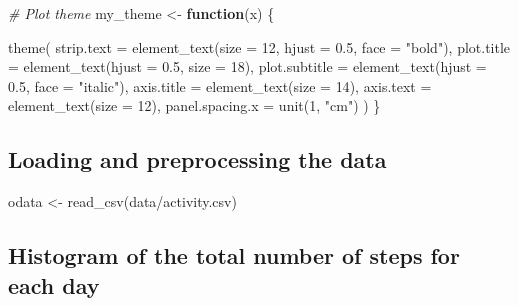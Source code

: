 \documentclass[
  paper=a4,
  ,captions=tableheading
]{scrartcl}
\newenvironment{Shaded}{\begin{snugshade}}{\end{snugshade}}
\newcommand{\AttributeTok}[1]{\textcolor[rgb]{0.77,0.63,0.00}{#1}}
\newcommand{\CommentTok}[1]{\textcolor[rgb]{0.56,0.35,0.01}{\textit{#1}}}
\newcommand{\ControlFlowTok}[1]{\textcolor[rgb]{0.13,0.29,0.53}{\textbf{#1}}}
\newcommand{\DecValTok}[1]{\textcolor[rgb]{0.00,0.00,0.81}{#1}}
\newcommand{\FloatTok}[1]{\textcolor[rgb]{0.00,0.00,0.81}{#1}}
\newcommand{\FunctionTok}[1]{\textcolor[rgb]{0.00,0.00,0.00}{#1}}
\newcommand{\NormalTok}[1]{#1}
\newcommand{\OtherTok}[1]{\textcolor[rgb]{0.56,0.35,0.01}{#1}}
\newcommand{\StringTok}[1]{\textcolor[rgb]{0.31,0.60,0.02}{#1}}
\begin{document}
\begin{Shaded}
\begin{Highlighting}[]
\CommentTok{\# Plot theme}
\NormalTok{my\_theme }\OtherTok{\textless{}{-}} \ControlFlowTok{function}\NormalTok{(x) \{}
  
    \FunctionTok{theme}\NormalTok{(}
    \AttributeTok{strip.text =} \FunctionTok{element\_text}\NormalTok{(}\AttributeTok{size =} \DecValTok{12}\NormalTok{, }\AttributeTok{hjust =} \FloatTok{0.5}\NormalTok{, }\AttributeTok{face =} \StringTok{"bold"}\NormalTok{),}
    \AttributeTok{plot.title =} \FunctionTok{element\_text}\NormalTok{(}\AttributeTok{hjust =} \FloatTok{0.5}\NormalTok{, }\AttributeTok{size =} \DecValTok{18}\NormalTok{),}
    \AttributeTok{plot.subtitle =} \FunctionTok{element\_text}\NormalTok{(}\AttributeTok{hjust =} \FloatTok{0.5}\NormalTok{, }\AttributeTok{face =} \StringTok{"italic"}\NormalTok{),}
    \AttributeTok{axis.title =} \FunctionTok{element\_text}\NormalTok{(}\AttributeTok{size =} \DecValTok{14}\NormalTok{),}
    \AttributeTok{axis.text =} \FunctionTok{element\_text}\NormalTok{(}\AttributeTok{size =} \DecValTok{12}\NormalTok{),}
    \AttributeTok{panel.spacing.x =} \FunctionTok{unit}\NormalTok{(}\DecValTok{1}\NormalTok{, }\StringTok{"cm"}\NormalTok{)}
\NormalTok{  )}
\NormalTok{\}}
\end{Highlighting}
\end{Shaded}

\hypertarget{loading-and-preprocessing-the-data}{%
\subsection{Loading and preprocessing the
data}\label{loading-and-preprocessing-the-data}}

\begin{Shaded}
\begin{Highlighting}[]
\NormalTok{odata }\OtherTok{\textless{}{-}} \FunctionTok{read\_csv}\NormalTok{(}\StringTok{\textquotesingle{}data/activity.csv\textquotesingle{}}\NormalTok{)}
\end{Highlighting}
\end{Shaded}

\hypertarget{histogram-of-the-total-number-of-steps-for-each-day}{%
\subsection{Histogram of the total number of steps for each
day}\label{histogram-of-the-total-number-of-steps-for-each-day}}
\end{document}
